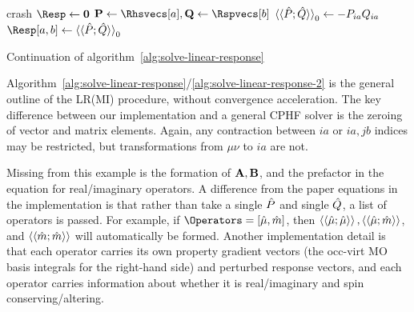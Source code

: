 \begin{algorithm}
  \centering
  \begin{algorithmic}[1]
        \EndFor
        \State crash
      \EndIf
    \EndFor
  \EndFor
  \State \(\Resp \gets \mat{0}\)
      \State \(\mat{P} \gets \Rhsvecs[a], \mat{Q} \gets \Rspvecs[b]\)
      \State \(\braket{\braket{\hat{P}; \hat{Q}}}_{0} \gets -P_{ia}Q_{ia}\)
      \State \(\Resp[a,b] \gets \lr{P}{Q}_{0}\)
    \EndFor
  \EndFor
  \EndProcedure
  \end{algorithmic}
  \caption{Continuation of algorithm~\ref{alg:solve-linear-response}}
  \label{alg:solve-linear-response-2}
\end{algorithm}

Algorithm~\ref{alg:solve-linear-response}/\ref{alg:solve-linear-response-2} is the general outline of the LR(MI) procedure, without convergence acceleration. The key difference between our implementation and a general CPHF solver is the zeroing of vector and matrix elements. Again, any contraction between \(ia\) or \(ia,jb\) indices may be restricted, but transformations from \(\mu\nu\) to \(ia\) are not.

Missing from this example is the formation of \(\mathbf{A}, \mathbf{B}\), and the prefactor in the equation for real/imaginary operators. A difference from the paper equations in the implementation is that rather than take a single \(\hat{P}\) and single \(\hat{Q}\), a list of operators is passed. For example, if \(\Operators = [\op{\mu}, \op{m}]\), then \(\braket{\braket{\hat{\mu}; \hat{\mu}}},\braket{\braket{\hat{\mu}; \hat{m}}}\), and \(\braket{\braket{\hat{m}; \hat{m}}}\) will automatically be formed. Another implementation detail is that each operator carries its own property gradient vectors (the occ-virt MO basis integrals for the right-hand side) and perturbed response vectors, and each operator carries information about whether it is real/imaginary and spin conserving/altering.
